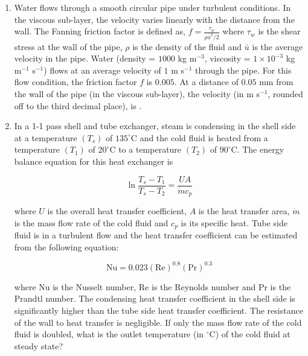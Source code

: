 \documentclass[journal,12pt,onecolumn]{IEEEtran}
\theoremstyle{remark}
\begin{document}
\begin{enumerate}
\item Water flows through a smooth circular pipe under turbulent conditions. In the viscous sub-layer, the velocity varies linearly with the distance from the wall. The Fanning friction factor is defined as, $f = \frac{\tau_w}{\rho \bar{u}^2/2}$ where $\tau_w$ is the shear stress at the wall of the pipe, $\rho$ is the density of the fluid and $\bar{u}$ is the average velocity in the pipe. Water (density = $1000$ kg m$^{-3}$, viscosity = $1 \times 10^{-3}$ kg m$^{-1}$ s$^{-1}$) flows at an average velocity of $1$ m s$^{-1}$ through the pipe. For this flow condition, the friction factor $f$ is $0.005$. At a distance of $0.05$ mm from the wall of the pipe (in the viscous sub-layer), the velocity (in m s$^{-1}$, rounded off to the third decimal place), is \underline{\hspace{1cm}}.\hfill{}

\item In a 1-1 pass shell and tube exchanger, steam is condensing in the shell side at a temperature $(T_s)$ of $135^\circ\text{C}$ and the cold fluid is heated from a temperature $(T_1)$ of $20^\circ\text{C}$ to a temperature $(T_2)$ of $90^\circ\text{C}$. The energy balance equation for this heat exchanger is

\[\ln \frac{T_s - T_1}{T_s - T_2} = \frac{UA}{\dot{m}c_p}\]

where $U$ is the overall heat transfer coefficient, $A$ is the heat transfer area, $\dot{m}$ is the mass flow rate of the cold fluid and $c_p$ is its specific heat. Tube side fluid is in a turbulent flow and the heat transfer coefficient can be estimated from the following equation:

\[\text{Nu} = 0.023 (\text{Re})^{0.8}(\text{Pr})^{0.3}\]

where Nu is the Nusselt number, Re is the Reynolds number and Pr is the Prandtl number. The condensing heat transfer coefficient in the shell side is significantly higher than the tube side heat transfer coefficient. The resistance of the wall to heat transfer is negligible. If only the mass flow rate of the cold fluid is doubled, what is the outlet temperature (in $^\circ\text{C}$) of the cold fluid at steady state?
\hfill{}
\begin{enumerate}
\end{enumerate}


\end{enumerate}
\end{document}
